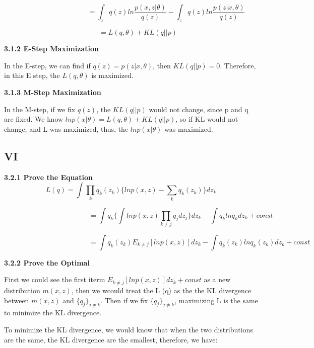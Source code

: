 \documentclass{article} %
\begin{document}
\begin{equation}
\qquad \qquad \qquad \qquad \qquad =
\int_z q (z) ln \frac{p (x,z | \theta)}{q (z)} -
\int_z q (z) ln \frac{p (z | x,\theta)}{q (z)}
\end{equation}

\begin{equation}
\qquad =
L (q, \theta) + KL (q || p)
\end{equation}

\textbf{3.1.2 E-Step Maximization}

In the E-step, we can find if $q (z) = p (z | x, \theta)$, then
$KL (q || p) = 0$. Therefore, in this E step, the $L (q, \theta)$ is maximized.

\textbf{3.1.3 M-Step Maximization}

In the M-step, if we fix $q (z)$, the $KL (q||p)$ would not change, since p and
q are fixed. We know $ln p (x | \theta) = L (q, \theta) + KL (q||p)$, so if KL would
not change, and L was maximized, thus, the $ln p (x | \theta)$ was maximized.


\subsection{VI}

\textbf{3.2.1 Prove the Equation}
\begin{equation}
L (q) = \int \prod_k q_k (z_k) \{ ln p (x, z) - \sum_k q_k (z_k) \} d z_k
\end{equation}

\begin{equation}
\qquad \qquad \qquad \qquad \qquad \qquad =
\int q_k \{ \int ln p (x,z) \prod_{k \neq j} q_j dz_j\} d z_k -
\int q_k ln q_k d z_k + const
\end{equation}

\begin{equation}
\qquad \qquad \qquad \qquad \qquad \qquad =
\int q_k (z_k) E_{k \neq j} [ ln p (x,z) ] dz_k -
\int q_k (z_k ) ln q_k (z_k) d z_k + const
\end{equation}

\textbf{3.2.2 Prove the Optimal}

First we could see the first iterm $E_{k \neq j} [ ln p (x,z) ] dz_k + const$ as
a new distribution $m (x,z)$, then we wcould treat the L (q) as the the KL
divergence between $m (x,z)$ and $\{q_j\}_{j \neq k}$. Then if we fix
$\{q_j\}_{j \neq k}$, maximizing L is the same to minimize the KL divergence.

To minimize the KL divergence, we would know that when the two distributions are
the same, the KL divergence are the smallest, therefore, we have:
\end{document}
